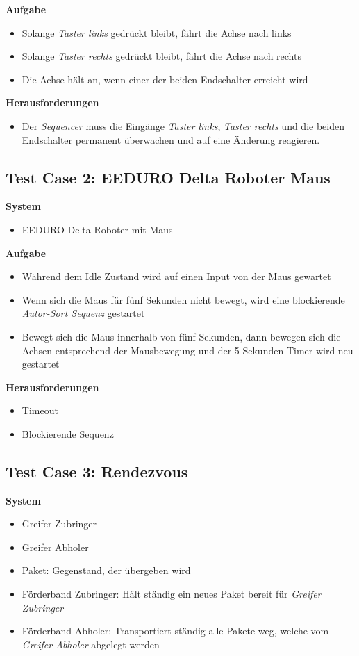 \textbf{Aufgabe}
\begin{itemize}
\item Solange \textit{Taster links} gedrückt bleibt, fährt die Achse nach links
\item Solange \textit{Taster rechts} gedrückt bleibt, fährt die Achse nach rechts
\item Die Achse hält an, wenn einer der beiden Endschalter erreicht wird
\end{itemize}

\textbf{Herausforderungen}
\begin{itemize}
\item Der \textit{Sequencer} muss die Eingänge \textit{Taster links}, \textit{Taster rechts} und die beiden Endschalter permanent überwachen und auf eine Änderung reagieren.
\end{itemize}


\subsection{Test Case 2: EEDURO Delta Roboter Maus}
\textbf{System}
\begin{itemize}
\item EEDURO Delta Roboter mit Maus
\end{itemize}

\textbf{Aufgabe}
\begin{itemize}
\item Während dem Idle Zustand wird auf einen Input von der Maus gewartet
\item Wenn sich die Maus für fünf Sekunden nicht bewegt, wird eine blockierende \textit{Autor-Sort Sequenz} gestartet
\item Bewegt sich die Maus innerhalb von fünf Sekunden, dann bewegen sich die Achsen entsprechend der Mausbewegung und der 5-Sekunden-Timer wird neu gestartet
\end{itemize}

\textbf{Herausforderungen}
\begin{itemize}
\item Timeout
\item Blockierende Sequenz
\end{itemize}


\subsection{Test Case 3: Rendezvous}
\textbf{System}
\begin{itemize}
\item Greifer Zubringer
\item Greifer Abholer
\item Paket: Gegenstand, der übergeben wird
\item Förderband Zubringer: Hält ständig ein neues Paket bereit für \textit{Greifer Zubringer}
\item Förderband Abholer: Transportiert ständig alle Pakete weg, welche vom \textit{Greifer Abholer} abgelegt werden
\end{itemize}

